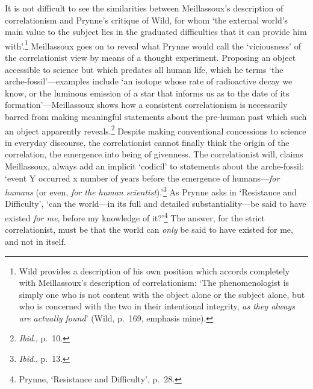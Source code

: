 \documentclass[]{article}
\begin{document}
\noindent It is not difficult to see the similarities between
Meillassoux’s description of correlationism and Prynne’s critique of
Wild, for whom ‘the external world’s main value to the subject lies in
the graduated difficulties that it can provide him with’.\footnote{Wild
  provides a description of his own position which accords completely
  with Meillassoux’s description of correlationism: ‘The phenomenologist
  is simply one who is not content with the object alone or the subject
  alone, but who is concerned with the two in their intentional
  integrity, \emph{as they always are actually found}’ (Wild, p.~169,
  emphasis mine).} Meillassoux goes on to reveal what Prynne would call
the ‘viciousness’ of the correlationist view by means of a thought
experiment. Proposing an object accessible to science but which predates
all human life, which he terms ‘the arche-fossil’—examples include ‘an
isotope whose rate of radioactive decay we know, or the luminous
emission of a star that informs us as to the date of its
formation’—Meillassoux shows how a consistent correlationism is
necessarily barred from making meaningful statements about the pre-human
past which such an object apparently reveals.\footnote{\emph{Ibid}.,
  p.~10.} Despite making conventional concessions to science in everyday
discourse, the correlationist cannot finally think the origin of the
correlation, the emergence into being of givenness. The correlationist
will, claims Meillassoux, always add an implicit ‘codicil’ to statements
about the arche-fossil: ‘event Y occurred x number of years before the
emergence of humans—\emph{for humans} (or even, \emph{for the human
scientist}).’\footnote{\emph{Ibid}., p.~13.} As Prynne asks in
‘Resistance and Difficulty’, ‘can the world—in its full and detailed
substantiality—be said to have existed \emph{for me}, before my
knowledge of it?’\footnote{Prynne, ‘Resistance and Difficulty’, p.~28.}
The answer, for the strict correlationist, must be that the world can
\emph{only} be said to have existed for me, and not in itself.
\end{document}
